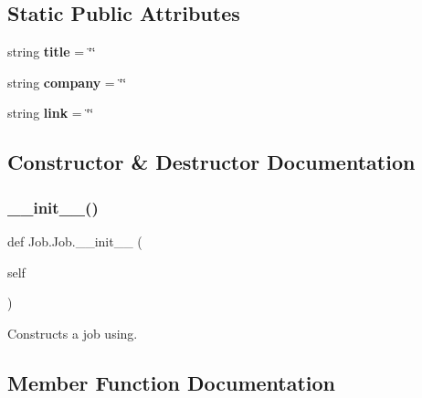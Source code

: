 \subsection*{Static Public Attributes}
\begin{DoxyCompactItemize}
\item 
\mbox{\label{classJob_1_1Job_a7d20895f10547392a4f3f2955af795c5}} 
string {\bfseries title} = \char`\"{}\char`\"{}
\item 
\mbox{\label{classJob_1_1Job_a0ca302355e0c98bcce407cf0e4f53fc0}} 
string {\bfseries company} = \char`\"{}\char`\"{}
\item 
\mbox{\label{classJob_1_1Job_ac025a689045bac25d8c4f5a0f1eb447a}} 
string {\bfseries link} = \char`\"{}\char`\"{}
\end{DoxyCompactItemize}


\subsection{Constructor \& Destructor Documentation}
\mbox{\label{classJob_1_1Job_a3fcc30f8e2d9302e6246adf71cd05ac0}} 
\subsubsection{\texorpdfstring{\+\_\+\+\_\+init\+\_\+\+\_\+()}{\_\_init\_\_()}}
{\footnotesize\ttfamily def Job.\+Job.\+\_\+\+\_\+init\+\_\+\+\_\+ (\begin{DoxyParamCaption}\item[{}]{self }\end{DoxyParamCaption})}



Constructs a job using. 



\subsection{Member Function Documentation}
\mbox{\label{classJob_1_1Job_ac6ded254e222637426d4d5a01db56e21}} 
